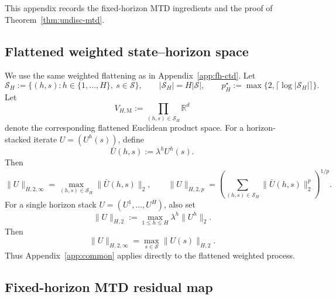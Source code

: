 \documentclass{article}
\newcommand{\X}{\mathcal{S}}
\newcommand{\R}{\mathbb{R}}
\begin{document}
This appendix records the fixed-horizon MTD ingredients and the proof of Theorem~\ref{thm:undisc-mtd}.

\subsection{Flattened weighted state--horizon space}

We use the same weighted flattening as in Appendix~\ref{app:fh-ctd}. Let
\begin{equation}
\mathcal S_H := \{(h,s): h\in\{1,\dots,H\},\ s\in \X\}, \qquad \lvert \mathcal S_H \rvert = H\lvert \X \rvert, \qquad p_H^\star := \max\{2,\lceil \log \lvert \mathcal S_H \rvert\rceil\}.
\end{equation}
Let
\begin{equation}
V_{H, \mathrm M} := \prod_{(h,s) \in \mathcal S_H} \R^d
\end{equation}
denote the corresponding flattened Euclidean product space. For a horizon-stacked iterate $U=(U^h(s))$, define
\begin{equation}
\bar{U}(h,s):=\lambda^h U^h(s).
\end{equation}
Then
\begin{equation}
\lVert U \rVert_{H,2,\infty} = \max_{(h,s)\in\mathcal S_H}\lVert \bar{U}(h,s) \rVert_2, \qquad \lVert U \rVert_{H,2,p} = \left( \sum_{(h,s)\in\mathcal S_H}\lVert \bar{U}(h,s) \rVert_2^p \right)^{1/p}.
\end{equation}
For a single horizon stack $U=(U^1,\dots,U^H)$, also set
\begin{equation}
\lVert U \rVert_{H,2} := \max_{1\le h\le H}\lambda^h\lVert U^h \rVert_2.
\end{equation}
Then
\begin{equation}
\lVert U \rVert_{H,2,\infty} = \max_{s\in \X}\lVert U(s) \rVert_{H,2}.
\end{equation}
Thus Appendix~\ref{app:common} applies directly to the flattened weighted process.

\subsection{Fixed-horizon MTD residual map}
\end{document}
